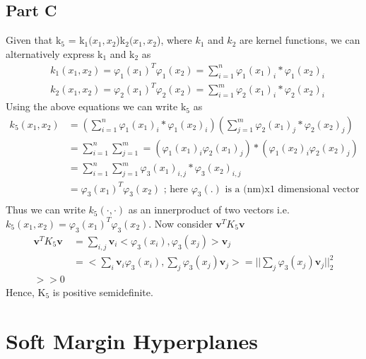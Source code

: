\documentclass[11pt]{article}
\begin{document}
\subsection{Part C}
Given that k$_5$ = k$_1(x_1,x_2$)k$_2(x_1,x_2$), where $k_1$ and $k_2$ are kernel functions, we can alternatively express k$_1$ and k$_2$ as 
\begin{equation*}
	\begin{split}
		& k_1(x_1,x_2) = \varphi_1(x_1)^T\varphi_1(x_2) = \sum_{i=1}^{n}\varphi_1(x_1)_i*\varphi_1(x_2)_i \\
		& k_2(x_1,x_2) = \varphi_2(x_1)^T\varphi_2(x_2) = \sum_{i=1}^{m}\varphi_2(x_1)_i*\varphi_2(x_2)_i
	\end{split}
\end{equation*}
Using the above equations we can write k$_5$ as
\begin{equation*}
	\begin{split}
		k_5(x_1,x_2) & = (\sum_{i=1}^{n}\varphi_1(x_1)_i*\varphi_1(x_2)_i)(\sum_{j=1}^{m}\varphi_2(x_1)_j*\varphi_2(x_2)_j) \\
		& = \sum_{i=1}^{n}\sum_{j=1}^{m} = (\varphi_1(x_1)_i\varphi_2(x_1)_j)*(\varphi_1(x_2)_i\varphi_2(x_2)_j) \\
		& = \sum_{i=1}^{n}\sum_{j=1}^{m}\varphi_3(x_1)_{i,j}*\varphi_3(x_2)_{i,j} \\
		& = \varphi_3(x_1)^T\varphi_3(x_2)\text{ ; here $\varphi_3(.)$ is a (nm)x1 dimensional vector} \\
	\end{split}
\end{equation*}
Thus we can write $k_5(\cdot,\cdot)$ as an innerproduct of two vectors i.e. $k_5(x_1,x_2) = \varphi_3(x_1)^T\varphi_3(x_2)$.
Now consider $\boldsymbol{v}^TK_5\boldsymbol{v}$ 
\begin{equation*}
	\begin{split}
		\boldsymbol{v}^TK_5\boldsymbol{v} &= \sum_{i,j}\boldsymbol{v}_i<\varphi_3(x_i),\varphi_3(x_j)>\boldsymbol{v}_j \\
		&= <\sum_i\boldsymbol{v}_i\varphi_3(x_i),\sum_j\varphi_3(x_j)\boldsymbol{v}_j> = ||\sum_j\varphi_3(x_j)\boldsymbol{v}_j||_2^2 \\> > 0
	\end{split}
\end{equation*}
Hence, K$_5$ is positive semidefinite.
\section{Soft Margin Hyperplanes}
\end{document}
